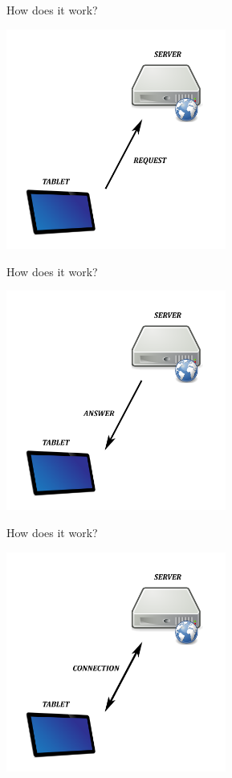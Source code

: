\documentclass[a4paper,10pt]{beamer}
\begin{document}
			\begin{frame}{How does it work?}
				\centerline{\includegraphics[height=205pt]{images/network/request.png}}
			\end{frame}
			
			\begin{frame}{How does it work?}
				\centerline{\includegraphics[height=205pt]{images/network/answer.png}}
			\end{frame}
			
			\begin{frame}{How does it work?}
				\centerline{\includegraphics[height=205pt]{images/network/connection.png}}
			\end{frame}
			
\end{document}
